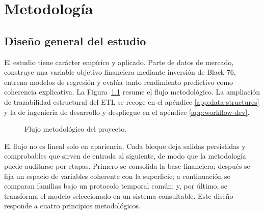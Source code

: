\chapter{Metodología}
\label{chap:metodologia}

\section{Diseño general del estudio}
\label{sec:diseno}

El estudio tiene carácter empírico y aplicado. Parte de datos de mercado, construye una variable objetivo financiera mediante inversión de Black-76, entrena modelos de regresión y evalúa tanto rendimiento predictivo como coherencia explicativa. La Figura~\ref{fig:metodologia-general} resume el flujo metodológico. La ampliación de trazabilidad estructural del ETL se recoge en el apéndice \ref{app:data-structures} y la de ingeniería de desarrollo y despliegue en el apéndice \ref{app:workflow-dev}.

\begin{figure}[htbp]
\centering
\small
{}
\caption{Flujo metodológico del proyecto.}
\label{fig:metodologia-general}
\end{figure}

El flujo no es lineal solo en apariencia. Cada bloque deja salidas persistidas y comprobables que sirven de entrada al siguiente, de modo que la metodología puede auditarse por etapas. Primero se consolida la base financiera; después se fija un espacio de variables coherente con la superficie; a continuación se comparan familias bajo un protocolo temporal común; y, por último, se transforma el modelo seleccionado en un sistema consultable. Este diseño responde a cuatro principios metodológicos.

